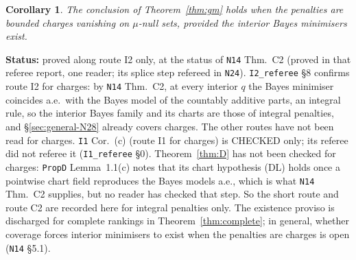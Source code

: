 \documentclass[11pt]{article}
\newtheorem{corollary}[theorem]{Corollary}
\theoremstyle{definition}
\theoremstyle{remark}
\newcommand{\src}[1]{\texttt{#1}}
\newcommand{\status}[1]{\par\smallskip\noindent\textbf{Status:} #1\par\smallskip}
\begin{document}
\begin{corollary}\label{cor:gmcharges}
The conclusion of Theorem~\ref{thm:gm} holds when the penalties are bounded charges vanishing on $\mu$-null sets, provided the interior Bayes minimisers exist.
\end{corollary}
\status{proved along route I2 only, at the status of \src{N14} Thm.~C2 (proved in that referee report, one reader; its splice step refereed in \src{N24}). \src{I2\_referee} \S8 confirms route I2 for charges: by \src{N14} Thm.~C2, at every interior $q$ the Bayes minimiser coincides a.e.\ with the Bayes model of the countably additive parts, an integral rule, so the interior Bayes family and its charts are those of integral penalties, and \S\ref{sec:general-N28} already covers charges. The other routes have not been read for charges. \src{I1} Cor.~(c) (route I1 for charges) is CHECKED only; its referee did not referee it (\src{I1\_referee} \S0). Theorem~\ref{thm:D} has not been checked for charges: \src{PropD} Lemma~1.1(c) notes that its chart hypothesis (DL) holds once a pointwise chart field reproduces the Bayes models a.e., which is what \src{N14} Thm.~C2 supplies, but no reader has checked that step. So the short route and route C2 are recorded here for integral penalties only. The existence proviso is discharged for complete rankings in Theorem~\ref{thm:complete}; in general, whether coverage forces interior minimisers to exist when the penalties are charges is open (\src{N14} \S5.1).}
\end{document}
